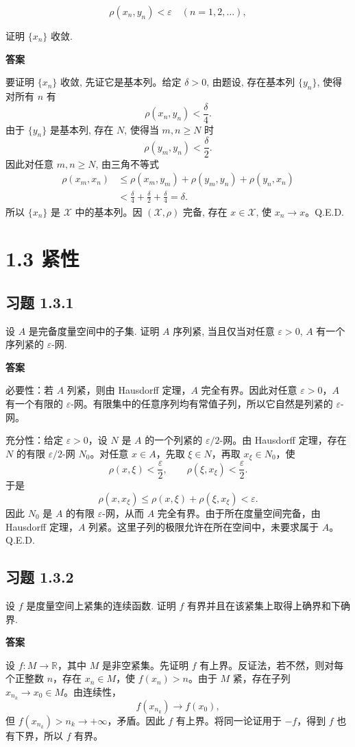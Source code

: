 \documentclass[UTF8,a4paper,11pt,fontset=fandol]{ctexart}
\newcommand{\exercise}[1]{\par\ifdim\dimexpr\pagegoal-\pagetotal\relax<7\baselineskip\newpage\fi\subsection*{习题 #1}}
\newcommand{\answer}{\par\smallskip\noindent\textbf{答案}\quad}
\newcommand{\qedherecustom}{\unskip\hfill\mbox{\normalfont Q.E.D.}\par}
\begin{document}
\[
\rho(x_n,y_n)<\varepsilon\quad(n=1,2,\ldots),
\]

证明 $\{x_n\}$ 收敛.

\answer

要证明 $\{x_n\}$ 收敛, 先证它是基本列。给定 $\delta>0$, 由题设, 存在基本列 $\{y_n\}$, 使得对所有 $n$ 有
\[
\rho(x_n,y_n)<\frac\delta4.
\]
由于 $\{y_n\}$ 是基本列, 存在 $N$, 使得当 $m,n\geq N$ 时
\[
\rho(y_m,y_n)<\frac\delta2.
\]
因此对任意 $m,n\geq N$, 由三角不等式
\[
\begin{aligned}
\rho(x_m,x_n)
&\leq\rho(x_m,y_m)+\rho(y_m,y_n)+\rho(y_n,x_n)\\
&<\frac\delta4+\frac\delta2+\frac\delta4
=\delta.
\end{aligned}
\]
所以 $\{x_n\}$ 是 $\mathcal X$ 中的基本列。因 $(\mathcal X,\rho)$ 完备, 存在 $x\in\mathcal X$, 使 $x_n\to x$。\qedherecustom

\clearpage
\section*{1.3 紧性}

\exercise{1.3.1}

设 $A$ 是完备度量空间中的子集. 证明 $A$ 序列紧, 当且仅当对任意 $\varepsilon>0$, $A$ 有一个序列紧的 $\varepsilon$-网.

\answer

必要性：若 $A$ 列紧，则由 Hausdorff 定理，$A$ 完全有界。因此对任意 $\varepsilon>0$，$A$ 有一个有限的 $\varepsilon$-网。有限集中的任意序列均有常值子列，所以它自然是列紧的 $\varepsilon$-网。

充分性：给定 $\varepsilon>0$，设 $N$ 是 $A$ 的一个列紧的 $\varepsilon/2$-网。由 Hausdorff 定理，存在 $N$ 的有限 $\varepsilon/2$-网 $N_0$。对任意 $x\in A$，先取 $\xi\in N$，再取 $x_\xi\in N_0$，使
\[
\rho(x,\xi)<\frac\varepsilon2,\qquad
\rho(\xi,x_\xi)<\frac\varepsilon2.
\]
于是
\[
\rho(x,x_\xi)\leq\rho(x,\xi)+\rho(\xi,x_\xi)<\varepsilon.
\]
因此 $N_0$ 是 $A$ 的有限 $\varepsilon$-网，从而 $A$ 完全有界。由于所在度量空间完备，由 Hausdorff 定理，$A$ 列紧。这里子列的极限允许在所在空间中，未要求属于 $A$。\qedherecustom

\exercise{1.3.2}

设 $f$ 是度量空间上紧集的连续函数. 证明 $f$ 有界并且在该紧集上取得上确界和下确界.

\answer

设 $f:M\to\mathbb R$，其中 $M$ 是非空紧集。先证明 $f$ 有上界。反证法，若不然，则对每个正整数 $n$，存在 $x_n\in M$，使 $f(x_n)>n$。由于 $M$ 紧，存在子列 $x_{n_k}\to x_0\in M$。由连续性，
\[
f(x_{n_k})\longrightarrow f(x_0),
\]
但 $f(x_{n_k})>n_k\to+\infty$，矛盾。因此 $f$ 有上界。将同一论证用于 $-f$，得到 $f$ 也有下界，所以 $f$ 有界。
\end{document}
